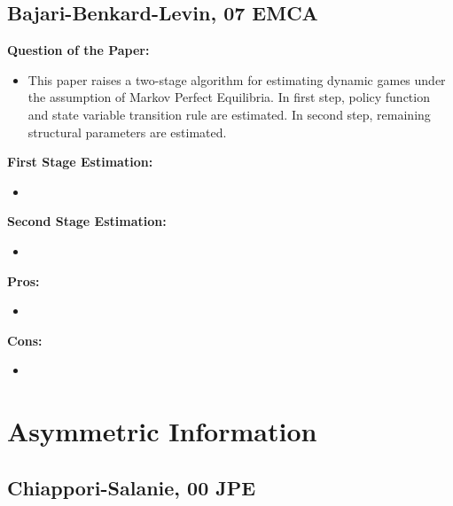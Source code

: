 \documentclass{book}
\theoremstyle{plain}
\theoremstyle{definition}
\begin{document}

\section{Bajari-Benkard-Levin, 07 EMCA} %
\label{sec:bajari_benkard_levin_07_emca}

\textbf{}

\vspace{1em}
\noindent
\textbf{Question of the Paper:}
\begin{itemize}
	\item This paper raises a two-stage algorithm for estimating dynamic games under the assumption of Markov Perfect Equilibria.
	In first step, policy function and state variable transition rule are estimated.
	In second step, remaining structural parameters are estimated.
\end{itemize}

\vspace{1em}
\noindent
\textbf{First Stage Estimation:}
\begin{itemize}
	\item 
\end{itemize}

\vspace{1em}
\noindent
\textbf{Second Stage Estimation:}
\begin{itemize}
	\item 
\end{itemize}

\vspace{1em}
\noindent
\textbf{Pros:}
\begin{itemize}
	\item 
\end{itemize}

\vspace{1em}
\noindent
\textbf{Cons:}
\begin{itemize}
	\item 
\end{itemize}







\chapter{Asymmetric Information} %
\label{cha:asymmetric_information}

\section{Chiappori-Salanie, 00 JPE} %
\label{sec:chiappori_salanie_00_jpe}
\end{document}
